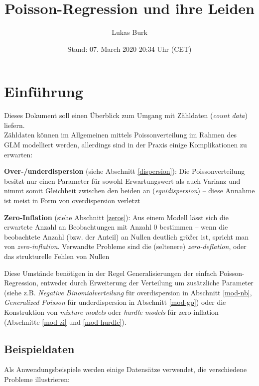 \documentclass[ngerman,a4paper,]{scrartcl}
\title{Poisson-Regression und ihre Leiden}
\author{Lukas Burk}
\date{Stand: 07. March 2020 20:34 Uhr (CET)}
\theoremstyle{definition}
\theoremstyle{definition}
\theoremstyle{definition}
\theoremstyle{remark}
\begin{document}
\maketitle

{
\hypersetup{linkcolor=}
\setcounter{tocdepth}{2}
\tableofcontents
}
\hypertarget{einfuxfchrung}{%
\section{Einführung}\label{einfuxfchrung}}

Dieses Dokument soll einen Überblick zum Umgang mit Zähldaten (\emph{count data}) liefern.\\
Zähldaten können im Allgemeinen mittels Poissonverteilung im Rahmen des GLM modelliert werden, allerdings sind in der Praxis einige Komplikationen zu erwarten:

\textbf{Over-/underdispersion} (siehe Abschnitt \ref{dispersion}): Die Poissonverteilung besitzt nur einen Parameter für sowohl Erwartungswert als auch Varianz und nimmt somit Gleichheit zwischen den beiden an (\emph{equidispersion}) -- diese Annahme ist meist in Form von overdispersion verletzt

\textbf{Zero-Inflation} (siehe Abschnitt \ref{zeros}): Aus einem Modell lässt sich die erwartete Anzahl an Beobachtungen mit Anzahl \(0\) bestimmen -- wenn die beobachtete Anzahl (bzw. der Anteil) an Nullen deutlich größer ist, spricht man von \emph{zero-inflation}. Verwandte Probleme sind die (seltenere) \emph{zero-deflation}, oder das strukturelle Fehlen von Nullen

Diese Umstände benötigen in der Regel Generalisierungen der einfach Poisson-Regression, entweder durch Erweiterung der Verteilung um zusätzliche Parameter (siehe z.B. \emph{Negative Binomialverteilung} für overdispersion in Abschnitt \ref{mod-nb}, \emph{Generalized Poisson} für underdispersion in Abschnitt \ref{mod-gp}) oder die Konstruktion von \emph{mixture models} oder \emph{hurdle models} für zero-inflation (Abschnitte \ref{mod-zi} und \ref{mod-hurdle}).

\hypertarget{data}{%
\subsection{Beispieldaten}\label{data}}

Als Anwendungsbeispiele werden einige Datensätze verwendet, die verschiedene Probleme illustrieren:
\end{document}
